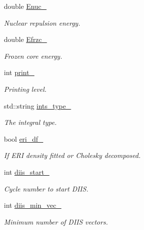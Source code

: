 \begin{DoxyCompactItemize}
double \mbox{\hyperlink{classforte_1_1_dynamic_correlation_solver_ae0e31a29aa63a9f11df1f08e903ef79f}{Enuc\+\_\+}}
\begin{DoxyCompactList}\small\item\em Nuclear repulsion energy. \end{DoxyCompactList}\item 
double \mbox{\hyperlink{classforte_1_1_dynamic_correlation_solver_a0f12440aa662e60a9348a375c8ab959a}{Efrzc\+\_\+}}
\begin{DoxyCompactList}\small\item\em Frozen core energy. \end{DoxyCompactList}\item 
int \mbox{\hyperlink{classforte_1_1_dynamic_correlation_solver_a3b2686df5f7abb843eeebb130dfc0827}{print\+\_\+}}
\begin{DoxyCompactList}\small\item\em Printing level. \end{DoxyCompactList}\item 
std\+::string \mbox{\hyperlink{classforte_1_1_dynamic_correlation_solver_a73a1949b72f47abf27cb7516719c2211}{ints\+\_\+type\+\_\+}}
\begin{DoxyCompactList}\small\item\em The integral type. \end{DoxyCompactList}\item 
bool \mbox{\hyperlink{classforte_1_1_dynamic_correlation_solver_ac481bf2ca528e1dadb34091d53e49423}{eri\+\_\+df\+\_\+}}
\begin{DoxyCompactList}\small\item\em If E\+RI density fitted or Cholesky decomposed. \end{DoxyCompactList}\item 
int \mbox{\hyperlink{classforte_1_1_dynamic_correlation_solver_a216ac5f54981981b1720b0aac57fc7ba}{diis\+\_\+start\+\_\+}}
\begin{DoxyCompactList}\small\item\em Cycle number to start D\+I\+IS. \end{DoxyCompactList}\item 
int \mbox{\hyperlink{classforte_1_1_dynamic_correlation_solver_ad58021bfd1f4c518d3d57183afdcd403}{diis\+\_\+min\+\_\+vec\+\_\+}}
\begin{DoxyCompactList}\small\item\em Minimum number of D\+I\+IS vectors. \end{DoxyCompactList}\item 

\end{DoxyCompactItemize}

